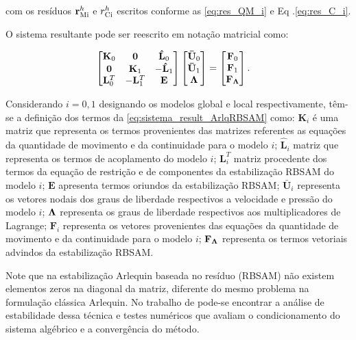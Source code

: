 \noindent com os resíduos $\mathbf{r}_{\mathrm{Mi}}^{h}$ e $r_{\mathrm{Ci}}^{h}$ escritos conforme as \autoref{eq:res_QM_i} e Eq .\ref{eq:res_C_i}.

O sistema resultante pode ser reescrito em notação matricial como:

\begin{align}
	\begin{bmatrix}
		\mathbf{K}_{0} & \mathbf{0} & \mathbf{\hat{L}}_{0} \\
		\mathbf{0} & \mathbf{K}_{1} & - \mathbf{\hat{L}}_{1} \\
		\mathbf{L}_{0}^{T} & -\mathbf{L}_{1}^{T} & \mathbf{E}
	\end{bmatrix}
	\begin{bmatrix}
		\mathbf{\bar{U}}_{0} \\
		\mathbf{\bar{U}}_{1} \\
		\boldsymbol{\Lambda}
	\end{bmatrix}
	&=
	\begin{bmatrix}
		\mathbf{F}_0 \\
		\mathbf{F}_1 \\
		\mathbf{F}_{\boldsymbol{\Lambda}}
	\end{bmatrix}.
	\label{eq:sistema_result_ArlqRBSAM}
\end{align}	

Considerando $i=0,1$ designando os modelos global e local respectivamente, têm-se a definição dos termos da \autoref{eq:sistema_result_ArlqRBSAM} como: $\mathbf{K}_{i}$ é uma matriz que representa os termos provenientes das matrizes referentes as equações da quantidade de movimento e da continuidade para o modelo $i$; $\mathbf{\hat{L}}_{i}$ matriz que representa os termos de acoplamento do modelo $i$; $\mathbf{L}_{i}^{T}$ matriz procedente dos termos da equação de restrição e de componentes da estabilização RBSAM do modelo $i$; $\mathbf{E}$ apresenta termos oriundos da estabilização RBSAM; $\mathbf{\bar{U}}_{i}$ representa os vetores nodais dos graus de liberdade respectivos a velocidade e pressão do modelo $i$; $\boldsymbol{\Lambda}$ representa os graus de liberdade respectivos aos multiplicadores de Lagrange; $\mathbf{F}_i$ representa os vetores provenientes das equações da quantidade de movimento e da continuidade para o modelo $i$; $\mathbf{F}_{\boldsymbol{\Lambda}}$ representa os termos vetoriais advindos da estabilização RBSAM. 

Note que na estabilização Arlequin baseada no resíduo (RBSAM) não existem elementos zeros na diagonal da matriz, diferente do mesmo problema na formulação clássica Arlequin. No trabalho de  pode-se encontrar a análise de estabilidade dessa técnica e testes numéricos que avaliam o condicionamento do sistema algébrico e a convergência do método.

